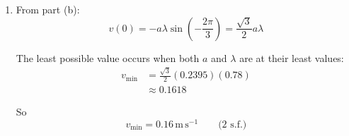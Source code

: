 \documentclass[leqno]{article}
\begin{document}
\begin{enumerate}[
  label=\textbf{\arabic*.},
  leftmargin=*,
  topsep=0pt,
  partopsep=0pt,
  parsep=0pt
]
\begin{djsSolution}
\begin{enumerate}[label=\textbf{(\alph*)}]
  Since $7.2$ lies within this interval, it cannot be determined for certain whether $r_m>7.2$.

  Therefore, the validity of the model is inconclusive from the given information.

  \item From part (b):
  \[
  v(0)=-a\lambda \sin\left(-\frac{2\pi}{3}\right)=\frac{\sqrt{3}}{2}a\lambda
  \]

  The least possible value occurs when both $a$ and $\lambda$ are at their least values:
  \begin{align*}
  v_{\min}&=\frac{\sqrt{3}}{2}(0.2395)(0.78)\\
          &\approx 0.1618
  \end{align*}

  So
  \[
  v_{\min}=0.16\,\mathrm{m\,s^{-1}}\qquad\text{(2 s.f.)}
  \]
\end{enumerate}
\end{djsSolution}

\end{enumerate}
\end{document}
